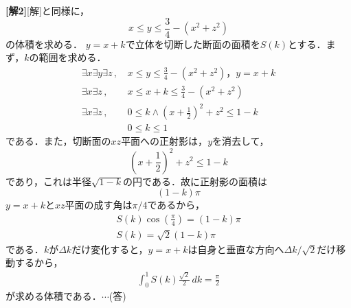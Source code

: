 \documentclass[a4j]{jarticle}
\begin{document}
\begin{multicols}{2}
{\bf[解2]}[解]と同様に，
     \[x\le y\le \frac{3}{4}-(x^2+z^2)\] 
の体積を求める．     
 $y=x+k$で立体を切断した断面の面積を$S(k)$とする．まず，$k$の範囲を求める．
      \begin{align*}
      \exists x\exists y\exists z\, ,\, &x\le y\le \frac{3}{4}-(x^2+z^2)，y=x+k \\
      \exists x \exists z \, ,\, &x\le x+k\le \frac{3}{4}-(x^2+z^2) \\
      \exists x \exists z \, ,\, &0\le k\land \left(x+\frac{1}{2}\right)^2+z^2\le 1-k \\
      &0\le k\le 1 
      \end{align*}
である．また，切断面の$xz$平面への正射影は，$y$を消去して，
     \[ \left(x+\frac{1}{2}\right)^2+z^2\le 1-k \]
であり，これは半径$\sqrt{1-k}$の円である．故に正射影の面積は
     \[(1-k)\pi\]
$y=x+k$と$xz$平面の成す角は$\pi/4$であるから，
     \begin{align*}
     S(k)\cos \left(\frac{\pi}{4}\right)=(1-k)\pi \\
     S(k)=\sqrt{2}(1-k)\pi
     \end{align*}
である．$k$が$\Delta k$だけ変化すると，$y=x+k$は自身と垂直な方向へ$\Delta k/\sqrt{2}$だけ移動するから，
     \begin{align*}
     \int_0^1S(k)\frac{\sqrt{2}}{2}\,dk=\frac{\pi}{2}
     \end{align*}
が求める体積である．$\cdots$(答)
\newpage
\end{multicols}
\end{document}
